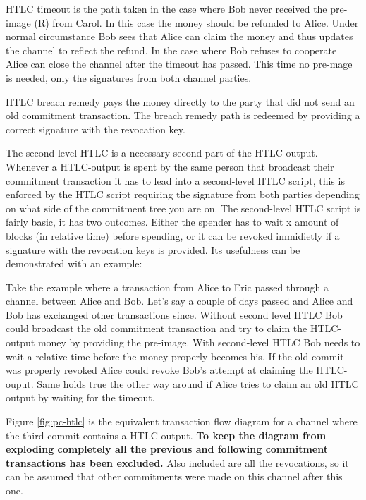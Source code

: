 HTLC timeout is the path taken in the case where Bob never received the pre-image (R) from Carol. In this case the money should be refunded to Alice. Under normal circumstance Bob sees that Alice can claim the money and thus updates the channel to reflect the refund. In the case where Bob refuses to cooperate Alice can close the channel after the timeout has passed. This time no pre-mage is needed, only the signatures from both channel parties.

HTLC breach remedy pays the money directly to the party that did not send an old commitment transaction. The breach remedy path is redeemed by providing a correct signature with the revocation key.

The second-level HTLC is a necessary second part of the HTLC output. Whenever a HTLC-output is spent by the same person that broadcast their commitment transaction it has to lead into a second-level HTLC script, this is enforced by the HTLC script requiring the signature from both parties depending on what side of the commitment tree you are on. The second-level HTLC script is fairly basic, it has two outcomes. Either the spender has to wait x amount of blocks (in relative time) before spending, or it can be revoked immidietly if a signature with the revocation keys is provided. Its usefulness can be demonstrated with an example:

Take the example where a transaction from Alice to Eric passed through a channel between Alice and Bob. Let's say a couple of days passed and Alice and Bob has exchanged other transactions since. Without second level HTLC Bob could broadcast the old commitment transaction and try to claim the HTLC-output money by providing the pre-image. With second-level HTLC Bob needs to wait a relative time before the money properly becomes his. If the old commit was properly revoked Alice could revoke Bob's attempt at claiming the HTLC-ouput. Same holds true the other way around if Alice tries to claim an old HTLC output by waiting for the timeout.

Figure \ref{fig:pc-htlc} is the equivalent transaction flow diagram for a channel where the third commit contains a HTLC-output. \textbf{To keep the diagram from exploding completely all the previous and following commitment transactions has been excluded.} Also included are all the revocations, so it can be assumed that other commitments were made on this channel after this one.  


